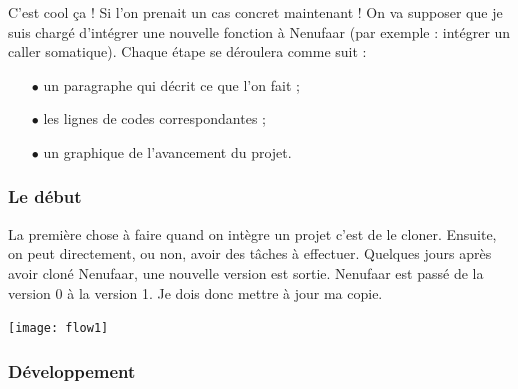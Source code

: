 \documentclass[12pt,a4paper]{article}
\begin{document}
C'est cool ça ! Si l'on prenait un cas concret maintenant ! On va supposer que je suis chargé d'intégrer une nouvelle fonction à Nenufaar (par exemple : intégrer un caller somatique). Chaque étape se déroulera comme suit :
\begin{itemize}
\item[$\bullet$] un paragraphe qui décrit ce que l'on fait ;
\item[$\bullet$] les lignes de codes correspondantes ;
\item[$\bullet$] un graphique de l'avancement du projet.
\end{itemize}

\subsubsection{Le début}

La première chose à faire quand on intègre un projet c'est de le cloner. Ensuite, on peut directement, ou non, avoir des tâches à effectuer. Quelques jours après avoir cloné Nenufaar, une nouvelle version est sortie. Nenufaar est passé de la version 0 à la version 1. Je dois donc mettre à jour ma copie.

\vspace{1cm}

{
}

\vspace{1cm}

\texttt{[image: flow1]}

\newpage

\subsubsection{Développement}
\end{document}
